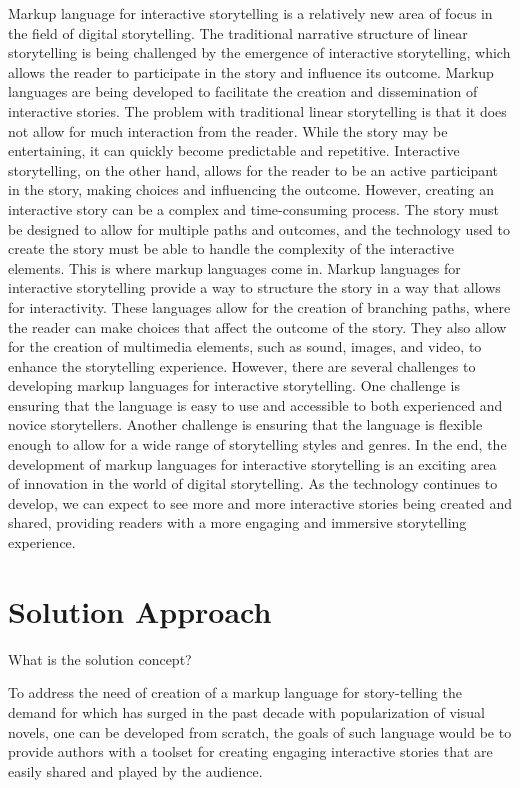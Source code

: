 Markup language for interactive storytelling is a relatively new area of focus in the field of digital storytelling. The traditional narrative structure of linear storytelling is being challenged by the emergence of interactive storytelling, which allows the reader to participate in the story and influence its outcome. Markup languages are being developed to facilitate the creation and dissemination of interactive stories.
The problem with traditional linear storytelling is that it does not allow for much interaction from the reader. While the story may be entertaining, it can quickly become predictable and repetitive. Interactive storytelling, on the other hand, allows for the reader to be an active participant in the story, making choices and influencing the outcome.
 However, creating an interactive story can be a complex and time-consuming process. The story must be designed to allow for multiple paths and outcomes, and the technology used to create the story must be able to handle the complexity of the interactive elements. This is where markup languages come in.
Markup languages for interactive storytelling provide a way to structure the story in a way that allows for interactivity. These languages allow for the creation of branching paths, where the reader can make choices that affect the outcome of the story. They also allow for the creation of multimedia elements, such as sound, images, and video, to enhance the storytelling experience.
However, there are several challenges to developing markup languages for interactive storytelling. One challenge is ensuring that the language is easy to use and accessible to both experienced and novice storytellers. Another challenge is ensuring that the language is flexible enough to allow for a wide range of storytelling styles and genres.
In the end, the development of markup languages for interactive storytelling is an exciting area of innovation in the world of digital storytelling. As the technology continues to develop, we can expect to see more and more interactive stories being created and shared, providing readers with a more engaging and immersive storytelling experience.

\section{Solution Approach} 
\noindent What is the solution concept?

To address the need of creation of a markup language for story-telling the demand for which has surged in the past decade with popularization of visual novels, one can be developed from scratch, the goals of such language would be to provide authors with a toolset for creating engaging interactive stories that are easily shared and played by the audience.

